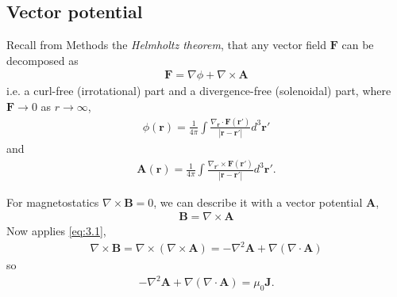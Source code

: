 \documentclass[a4paper]{article}
\begin{document}
\subsection{Vector potential}
Recall from Methods the \emph{Helmholtz theorem}, that any vector field $\mathbf{F}$ can be decomposed as 
\begin{equation*}\tag{3.10} \label{eq:3.10}
\begin{aligned}
\mathbf{F} = \nabla \phi + \nabla \times \mathbf{A}
\end{aligned}
\end{equation*}
i.e. a curl-free (irrotational) part and a divergence-free (solenoidal) part, where $\mathbf{F} \to 0$ as $r \to \infty$,
\begin{equation*}
\begin{aligned}
\phi(\mathbf{r}) = \frac{1}{4\pi} \int \frac{\nabla_\mathbf{r} \cdot \mathbf{F}(\mathbf{r}')}{|\mathbf{r} - \mathbf{r}'|} d^3 \mathbf{r}'
\end{aligned}
\end{equation*}
and
\begin{equation*}
\begin{aligned}
\mathbf{A}(\mathbf{r}) = \frac{1}{4\pi} \int \frac{\nabla_\mathbf{r'} \times \mathbf{F}(\mathbf{r'})}{|\mathbf{r}-\mathbf{r'}|} d^3 \mathbf{r}'.
\end{aligned}
\end{equation*}

For magnetostatics $\nabla \times \mathbf{B} = 0$, we can describe it with a vector potential $\mathbf{A}$,
\begin{equation*}\tag{3.11} \label{eq:3.11}
\begin{aligned}
\mathbf{B} = \nabla \times \mathbf{A}
\end{aligned}
\end{equation*}
Now applies \eqref{eq:3.1},
\begin{equation*}
\begin{aligned}
\nabla \times \mathbf{B} = \nabla \times (\nabla \times \mathbf{A}) = -\nabla^2 \mathbf{A} + \nabla(\nabla \cdot \mathbf{A})
\end{aligned}
\end{equation*}
so
\begin{equation*}\tag{3.12} \label{eq:3.12}
\begin{aligned}
-\nabla^2 \mathbf{A} + \nabla(\nabla \cdot \mathbf{A}) = \mu_0 \mathbf{J}.
\end{aligned}
\end{equation*}
\end{document}
